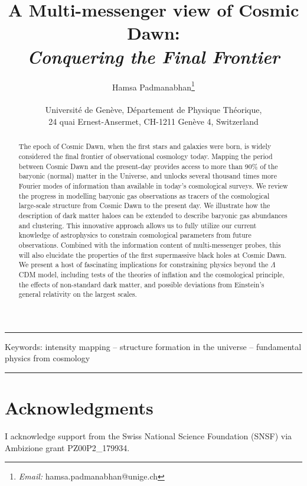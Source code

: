 \documentclass{article}
\title{\bf A Multi-messenger view of Cosmic Dawn:\\
\textit{Conquering the Final Frontier}}
\author{Hamsa Padmanabhan\footnote{\textit{Email:} hamsa.padmanabhan@unige.ch}\\
\\
Universit\'e de Gen\`eve, D\'epartement de Physique Th\'eorique,\\
24 quai Ernest-Ansermet, CH-1211 Gen\`eve 4, Switzerland\\
}
\date{}
\begin{document}
 
  \maketitle
  
  \hrule
 
  \begin{abstract}
The epoch of Cosmic Dawn, when the first stars and galaxies were born, is widely considered the final frontier of observational cosmology today. Mapping the period between Cosmic Dawn and the present-day provides access to more than 90\% of the baryonic (normal) matter in the Universe, and unlocks several thousand times more Fourier modes of information than available in today's cosmological surveys. We review the progress in modelling baryonic gas observations as tracers of the cosmological large-scale structure from Cosmic Dawn to the present day. We illustrate how the description of dark matter haloes can be extended to describe baryonic gas abundances and clustering. This innovative approach allows us to fully utilize our current knowledge of astrophysics to constrain cosmological parameters from future observations. Combined with the information content of multi-messenger probes, this will also elucidate the properties of the first supermassive black holes at Cosmic Dawn. We present a host of fascinating implications for constraining physics beyond the $\Lambda$CDM model, including tests of the theories of inflation and the cosmological principle, the effects of non-standard dark matter, and possible deviations from Einstein's general relativity on the largest scales.
 \end{abstract}
 \bigskip

Keywords: intensity mapping  -- structure formation in the universe -- fundamental physics from cosmology


\bigskip

\hrule


\newpage
\tableofcontents
\newpage



















\section{Acknowledgments}
I acknowledge support from the Swiss National Science Foundation (SNSF) via Ambizione grant PZ00P2\_179934.
\end{document}
